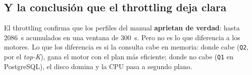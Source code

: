 \subsection{Y la conclusión que el throttling deja clara}

El throttling confirma que los perfiles del manual \textbf{aprietan de verdad}:
hasta \num{2086}~s acumulados en una ventana de 300~s. Pero no es lo que
diferencia a los motores. Lo que los diferencia es si la consulta cabe en memoria:
donde cabe (\texttt{Q2}, por el \emph{top-K}), gana el motor con el plan más
eficiente; donde no cabe (\texttt{Q1} en PostgreSQL), el disco domina y la CPU
pasa a segundo plano.

